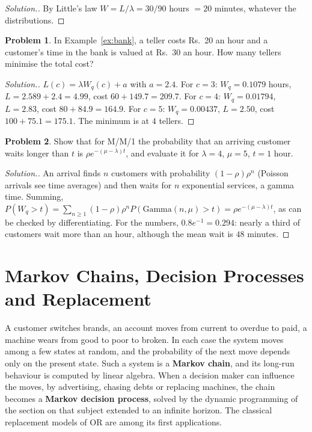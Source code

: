 \documentclass[11pt,a4paper]{article}
\numberwithin{equation}{section}
\theoremstyle{definition}
\newtheorem{problemx}{Problem}[subsection]
\newenvironment{problem}{\begin{problemx}}{\end{problemx}}
\newenvironment{solution}
  {\renewcommand{\qedsymbol}{}\begin{proof}[\textit{Solution}.]}
  {\end{proof}}
\begin{document}
\begin{solution}
By Little's law $W = L/\lambda = 30/90$ hours $= 20$ minutes, whatever the distributions.
\end{solution}

\begin{problem}
\label{prob:staffing}
In Example~\ref{ex:bank}, a teller costs Rs.~20 an hour and a customer's time in the bank is valued at Rs.~30 an hour. How many tellers minimise the total cost?
\end{problem}

\begin{solution}
$L(c) = \lambda W_q(c) + a$ with $a = 2.4$. For $c = 3$: $W_q = 0.1079$ hours, $L = 2.589 + 2.4 = 4.99$, cost $60 + 149.7 = 209.7$. For $c = 4$: $W_q = 0.01794$, $L = 2.83$, cost $80 + 84.9 = 164.9$. For $c = 5$: $W_q = 0.00437$, $L = 2.50$, cost $100 + 75.1 = 175.1$. The minimum is at $4$ tellers.
\end{solution}

\begin{problem}
Show that for M/M/1 the probability that an arriving customer waits longer than $t$ is $\rho e^{-(\mu - \lambda)t}$, and evaluate it for $\lambda = 4$, $\mu = 5$, $t = 1$ hour.
\end{problem}

\begin{solution}
An arrival finds $n$ customers with probability $(1 - \rho)\rho^n$ (Poisson arrivals see time averages) and then waits for $n$ exponential services, a gamma time. Summing, $P(W_q > t) = \sum_{n \geq 1}(1 - \rho)\rho^nP(\text{Gamma}(n, \mu) > t) = \rho e^{-(\mu - \lambda)t}$, as can be checked by differentiating. For the numbers,
$0.8e^{-1} = 0.294$: nearly a third of customers wait more than an hour, although the mean wait is $48$ minutes.
\end{solution}

\section{Markov Chains, Decision Processes and Replacement}
\label{sec:markov}

A customer switches brands, an account moves from current to overdue to paid, a machine wears from good to poor to broken. In each case the system moves among a few states at random, and the probability of the next move depends only on the present state. Such a system is a \textbf{Markov chain}, and its long-run behaviour is
computed by linear algebra. When a decision maker can influence the moves, by advertising, chasing debts or replacing machines, the chain becomes a \textbf{Markov decision process}, solved by the dynamic programming of the section on that subject extended to an infinite horizon. The classical replacement models of OR are among its first applications.
\end{document}
